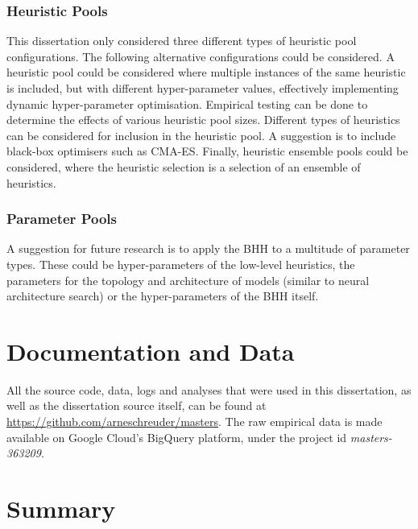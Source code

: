 \subsubsection{Heuristic Pools}
\label{sec:conclusion:further_research:heuristic_pools}

This dissertation only considered three different types of heuristic pool configurations. The following alternative configurations could be considered. A heuristic pool could be considered where multiple instances of the same heuristic is included, but with different hyper-parameter values, effectively implementing dynamic hyper-parameter optimisation. Empirical testing can be done to determine the effects of various heuristic pool sizes. Different types of heuristics can be considered for inclusion in the heuristic pool. A suggestion is to include black-box optimisers such as \acs{CMA-ES}. Finally, heuristic ensemble pools could be considered, where the heuristic selection is a selection of an ensemble of heuristics.

\subsubsection{Parameter Pools}
\label{sec:conclusion:further_research:parameter_pools}

A suggestion for future research is to apply the \acs{BHH} to a multitude of parameter types. These could be hyper-parameters of the low-level heuristics, the parameters for the topology and architecture of models (similar to neural architecture search) or the hyper-parameters of the \acs{BHH} itself.

\section{Documentation and Data}
\label{sec:conclusion:documentation_and_data}

All the source code, data, logs and analyses that were used in this dissertation, as well as the dissertation source itself, can be found at \url{https://github.com/arneschreuder/masters}. The raw empirical data is made available on Google Cloud's BigQuery platform, under the project id \textit{masters-363209}.


\section{Summary}
\label{sec:conclusion:summary}

